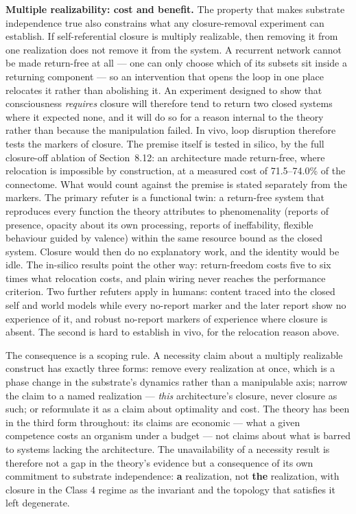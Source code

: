 \documentclass[12pt]{article}
\begin{document}
\textbf{Multiple realizability: cost and benefit.} The property that makes substrate independence true also constrains what any closure-removal experiment can establish. If self-referential closure is multiply realizable, then removing it from one realization does not remove it from the system. A recurrent network cannot be made return-free at all --- one can only choose which of its subsets sit inside a returning component --- so an intervention that opens the loop in one place relocates it rather than abolishing it. An experiment designed to show that consciousness \emph{requires} closure will therefore tend to return two closed systems where it expected none, and it will do so for a reason internal to the theory rather than because the manipulation failed. In vivo, loop disruption therefore tests the markers of closure. The premise itself is tested in silico, by the full closure-off ablation of Section~8.12: an architecture made return-free, where relocation is impossible by construction, at a measured cost of 71.5--74.0\% of the connectome. What would count against the premise is stated separately from the markers. The primary refuter is a functional twin: a return-free system that reproduces every function the theory attributes to phenomenality (reports of presence, opacity about its own processing, reports of ineffability, flexible behaviour guided by valence) within the same resource bound as the closed system. Closure would then do no explanatory work, and the identity would be idle. The in-silico results point the other way: return-freedom costs five to six times what relocation costs, and plain wiring never reaches the performance criterion. Two further refuters apply in humans: content traced into the closed self and world models while every no-report marker and the later report show no experience of it, and robust no-report markers of experience where closure is absent. The second is hard to establish in vivo, for the relocation reason above.

The consequence is a scoping rule. A necessity claim about a multiply realizable construct has exactly three forms: remove every realization at once, which is a phase change in the substrate's dynamics rather than a manipulable axis; narrow the claim to a named realization --- \emph{this} architecture's closure, never closure as such; or reformulate it as a claim about optimality and cost. The theory has been in the third form throughout: its claims are economic --- what a given competence costs an organism under a budget --- not claims about what is barred to systems lacking the architecture. The unavailability of a necessity result is therefore not a gap in the theory's evidence but a consequence of its own commitment to substrate independence: \textbf{a} realization, not \textbf{the} realization, with closure in the Class 4 regime as the invariant and the topology that satisfies it left degenerate.
\end{document}
